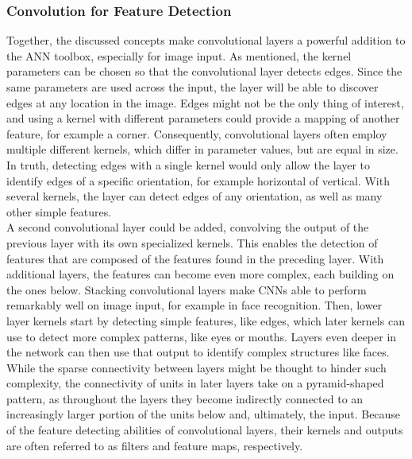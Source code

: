 \subsubsection{Convolution for Feature Detection}

Together, the discussed concepts make convolutional layers a powerful addition to the ANN toolbox, especially for image input. As mentioned, the kernel parameters can be chosen so that the convolutional layer detects edges. Since the same parameters are used across the input, the layer will be able to discover edges at any location in the image. Edges might not be the only thing of interest, and using a kernel with different parameters could provide a mapping of another feature, for example a corner. Consequently, convolutional layers often employ multiple different kernels, which differ in parameter values, but are equal in size. In truth, detecting edges with a single kernel would only allow the layer to identify edges of a specific orientation, for example horizontal of vertical. With several kernels, the layer can detect edges of any orientation, as well as many other simple features. \\

\noindent A second convolutional layer could be added, convolving the output of the previous layer with its own specialized kernels. This enables the detection of features that are composed of the features found in the preceding layer. With additional layers, the features can become even more complex, each building on the ones below. Stacking convolutional layers make CNNs able to perform remarkably well on image input, for example in face recognition. Then, lower layer kernels start by detecting simple features, like edges, which later kernels can use to detect more complex patterns, like eyes or mouths. Layers even deeper in the network can then use that output to identify complex structures like faces. While the sparse connectivity between layers might be thought to hinder such complexity, the connectivity of units in later layers take on a pyramid-shaped pattern, as throughout the layers they become indirectly connected to an increasingly larger portion of the units below and, ultimately, the input. Because of the feature detecting abilities of convolutional layers, their kernels and outputs are often referred to as filters and feature maps, respectively. \\

